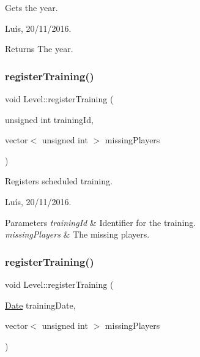 Gets the year. 

Luís, 20/11/2016. 

\begin{DoxyReturn}{Returns}
The year. 
\end{DoxyReturn}
\hypertarget{class_level_a347646f5e92f549ac4467afb8fc723f1}{}\label{class_level_a347646f5e92f549ac4467afb8fc723f1} 
\subsubsection{\texorpdfstring{register\+Training()}{registerTraining()}\hspace{0.1cm}{\footnotesize\ttfamily [1/2]}}
{\footnotesize\ttfamily void Level\+::register\+Training (\begin{DoxyParamCaption}\item[{unsigned int}]{training\+Id,  }\item[{vector$<$ unsigned int $>$}]{missing\+Players }\end{DoxyParamCaption})}



Registers scheduled training. 

Luís, 20/11/2016. 


\begin{DoxyParams}{Parameters}
{\em training\+Id} & Identifier for the training. \\
\hline
{\em missing\+Players} & The missing players. \\
\hline
\end{DoxyParams}
\hypertarget{class_level_afed5cd2f4b28935b95c6541d6e15c8a0}{}\label{class_level_afed5cd2f4b28935b95c6541d6e15c8a0} 
\subsubsection{\texorpdfstring{register\+Training()}{registerTraining()}\hspace{0.1cm}{\footnotesize\ttfamily [2/2]}}
{\footnotesize\ttfamily void Level\+::register\+Training (\begin{DoxyParamCaption}\item[{\hyperlink{class_date}{Date}}]{training\+Date,  }\item[{vector$<$ unsigned int $>$}]{missing\+Players }\end{DoxyParamCaption})}



